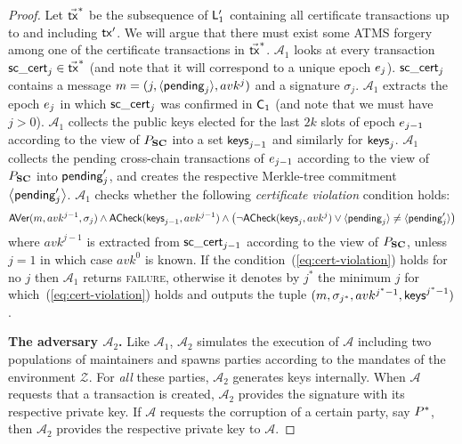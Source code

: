 \begin{proof}
  Let $\vec{\mathsf{tx}}^*$ be the subsequence of $\mathsf{L}'_1$ containing all certificate
  transactions up to and including $\mathsf{tx}'$. We will argue that there must exist
  some ATMS forgery among one of the certificate transactions in $\vec{\mathsf{tx}}^*$.
  $\mathcal{A}_1$ looks at every transaction $\mathsf{sc\_cert}_j\in\vec{\mathsf{tx}}^*$ (and note
  that it will correspond to a unique epoch $e_j$). $\mathsf{sc\_cert}_j$ contains a
  message $m = (j,\langle\mathsf{pending}_j\rangle, avk^j)$ and a signature $\sigma_j$.
  $\mathcal{A}_1$ extracts the epoch $e_j$ in
  which $\mathsf{sc\_cert}_j$ was confirmed in $\mathsf{C}_1$ (and note that we must have $j >
  0$). $\mathcal{A}_1$ collects the public keys elected for the last $2k$ slots
  of epoch $e_{j-1}$ according to the view of $P_{\mathbf{SC}}$
  into a set $\textsf{keys}_{j-1}$ and similarly for $\textsf{keys}_j$. $\mathcal{A}_1$
  collects the pending cross-chain transactions of $e_{j-1}$ according to
  the view of $P_{\mathbf{SC}}$ into $\mathsf{pending}'_j$, and creates the respective
  Merkle-tree commitment $\left\langle \mathsf{pending}'_j \right\rangle$.
  $\mathcal{A}_1$
  checks whether the following \emph{certificate violation} condition holds:
  \begin{equation}
    \label{eq:cert-violation}
    \textsf{AVer}(m, avk^{j-1}, \sigma_j)
    \land
    \textsf{ACheck}(\textsf{keys}_{j-1}, avk^{j-1})
    \land
    \left(
      \lnot \textsf{ACheck}(\textsf{keys}_j, avk^j)
      \lor
      \langle\mathsf{pending}_j\rangle \neq \langle\mathsf{pending}'_j\rangle
    \right)
  \end{equation}
  where $avk^{j-1}$ is extracted from $\mathsf{sc\_cert}_{j-1}$ according to the view of
  $P_{\mathbf{SC}}$, unless $j = 1$ in which case $avk^0$ is known.
  If the condition~(\ref{eq:cert-violation}) holds for no $j$ then
  $\mathcal{A}_1$ returns \textsc{failure}, otherwise it denotes by $j^*$ the
  minimum $j$ for which~(\ref{eq:cert-violation}) holds and outputs the tuple
  $(m, \sigma_{j^*}, avk^{j^*-1}, \textsf{keys}^{j^*-1})$.

  \bigskip
  \textbf{The adversary $\mathcal{A}_2$.}
  Like $\mathcal{A}_1$, $\mathcal{A}_2$ simulates the execution of
  $\mathcal{A}$ including two populations of maintainers and spawns parties
  according to the mandates of the environment $\mathcal{Z}$. For \emph{all}
  these parties, $\mathcal{A}_2$ generates keys internally. When $\mathcal{A}$
  requests that a transaction is created, $\mathcal{A}_2$ provides the signature
  with its respective private key. If $\mathcal{A}$ requests the corruption of a
  certain party, say $P^*$, then $\mathcal{A}_2$ provides the respective
  private key to $\mathcal{A}$.


\end{proof}
